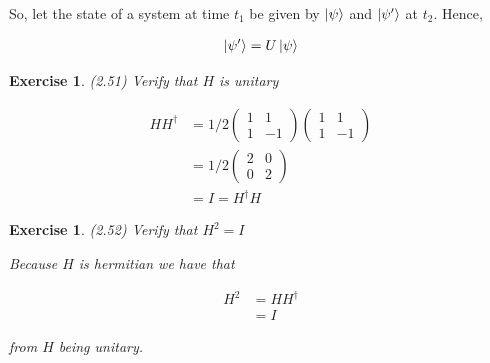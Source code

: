 \documentclass[11pt]{article}
\newcommand\0{\mathbf{0}}
\newcommand\<{\langle}
\renewcommand\>{\rangle}
\newtheorem{exercise}[theorem]{Exercise}
\begin{document}
So, let the state of a system at time $t_1$ be given by $\ket{\psi}$ and $\ket{\psi'}$ at $t_2$. Hence,

\begin{align*}
\ket{\psi'} = U\ket{\psi}	
\end{align*}

\begin{exercise}
(2.51) Verify that $H$ is unitary 

\begin{align*}
HH^\dag &= 1/2\begin{pmatrix} 1 & 1 \\ 1 & -1\end{pmatrix}\begin{pmatrix} 1 & 1 \\ 1 & -1\end{pmatrix} \\
&= 1/2\begin{pmatrix} 2 & 0 \\ 0 & 2 \end{pmatrix} \\
&= I = H^\dag H
\end{align*}
\end{exercise}

\begin{exercise}
(2.52) Verify that $H^2 = I$

Because $H$ is hermitian we have that 

\begin{align*}
H^2 &= HH^\dag \\
&= I
\end{align*}

from $H$ being unitary.
\end{exercise}
\end{document}
